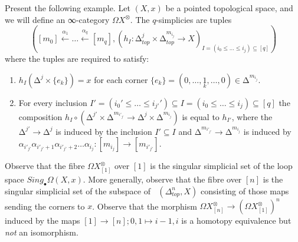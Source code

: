 \documentclass[a4paper]{amsart}
\numberwithin{figure}{section}
\theoremstyle{theorem}
\theoremstyle{definition}
\DeclareMathOperator{\uhom}{\underline{hom}}
\begin{document}
Present the following example. Let $(X, x)$ be a pointed topological space, and we will define an ∞-category $\Omega X^\otimes$. The $q$-simplicies are tuples
\[ ([m_0] {\stackrel{\alpha_1}{\leftarrow}} \dots {\stackrel{\alpha_q}{\leftarrow}} [m_q], (h_I: ∆^{j}_{top} {\times} ∆^{m_{i_j}}_{top} \to X)_{I = (i_0 ≤ \dots ≤ i_j) \subseteq [q]})  \]
where the tuples are required to satisfy:
\begin{enumerate}
 \item $h_I(∆^{j}{\times}\{e_k\}) = x$ for each corner $\{e_k\} = (0, \dots, \underset{k}{1}, \dots, 0) \in ∆^{m_{i_j}}$.
 \item For every inclusion $ I' = (i_0' ≤ \dots ≤ i_{j'}') \subseteq I = (i_0 ≤ \dots ≤ i_{j}) \subseteq [q]$ the composition $h_I \circ (∆^{j'} {\times} ∆^{m_{i'_{j'}}} {→} ∆^{j} {\times} ∆^{m_{i_j}})$ is equal to $h_{I'}$, where the $∆^{j'}{→}∆^{j}$ is induced by the inclusion $I' ⊆ I$ and $∆^{m_{i'_{j'}}} {→} ∆^{m_{i_j}}$ is induced by $\alpha_{i'_{j'}} \alpha_{i'_{j'}{+}1} \alpha_{i'_{j'}{+}2} \dots \alpha_{i_j}:[m_{i_j}] {→} [m_{i'_{j'}}]$.
\end{enumerate}
Observe that the fibre $\Omega X^\otimes_{[1]}$ over $[1]$ is the singular simplicial set of the loop space $Sing_\bullet \Omega (X, x)$. %
More generally, observe that the fibre over $[n]$ is the singular simplicial set of the subspace of $\uhom(\Delta_{top}^n, X)$ consisting of those maps sending the corners to $x$. %
Observe that the morphism $\Omega X^\otimes_{[n]} \to (\Omega X^\otimes_{[1]})^n$ induced by the maps $[1] {→} [n]; 0,1 \mapsto i{-}1,i$ is a homotopy equivalence but \emph{not} an isomorphism. %
\end{document}
